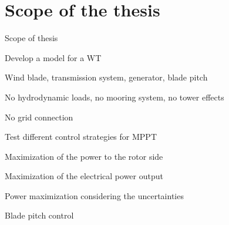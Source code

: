 
\section{Scope of the thesis}
\begin{frame}{Scope of thesis}
  \begin{myitemize}
    \item Develop a model for a WT
    \begin{myitemize}
      \item Wind blade, transmission system, generator, blade pitch
      \item No hydrodynamic loads, no mooring system, no tower effects
      \item No grid connection
    \end{myitemize} 

    \item Test different control strategies for MPPT
    \begin{myitemize}
      \item Maximization of the power to the rotor side
      \item Maximization of the electrical power output
      \item Power maximization considering the uncertainties
    \end{myitemize}

    \item Blade pitch control
  \end{myitemize}


\end{frame}


                                                    
